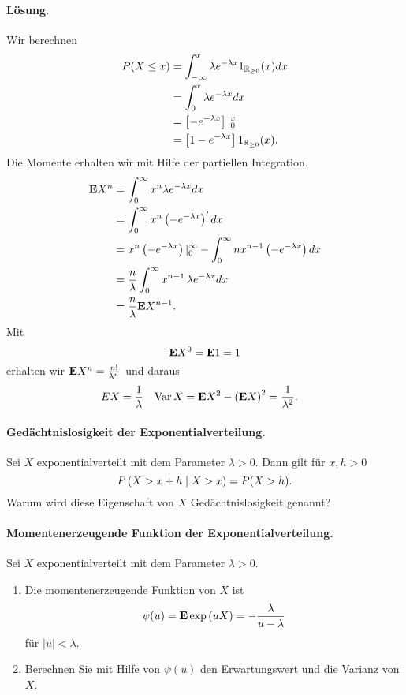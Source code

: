 \paragraph*{Lösung. } 
Wir berechnen
\begin{align*}
    P(X \leq x) & = 
    \int_{-\infty}^{x} \lambda e^{-\lambda x } 1_{\mathbb R_{\geq 0}}(x) dx \\
    &= \int_{0}^{x} \lambda e^{-\lambda x } dx \\
    &= \left[  - e^{-\lambda x}  \right] |_{0}^{x} \\
    &= \left[ 1 - e^{-\lambda x} \right] 1_{\mathbb R_{\geq 0}}(x).
\end{align*}
Die Momente erhalten wir mit Hilfe der partiellen Integration. 
\begin{align*}
    \mathbf{E} X^n &= \int_{0}^{\infty} x^n \lambda e^{- \lambda x} dx \\
    &= \int_{0}^{\infty} x^n\left( -e^{-\lambda x} \right)' dx \\
    &= x^n \left( - e^{-\lambda x} \right)|_{0}^{\infty} 
    - \int_{0}^{\infty} n x^{n-1} \left( -e^{-\lambda x} \right) dx  \\
    &= \frac{n}{\lambda} \int_{0}^{\infty} x^{n-1}\, \lambda e^{-\lambda x} dx \\
    & = \frac{n}{\lambda} \mathbf{E} X^{n-1}.
\end{align*}
Mit
\begin{equation*}
    \mathbf{E} X^{0} = \mathbf{E} 1 = 1
\end{equation*}
erhalten wir $\mathbf{E} X^n = \frac{n!}{\lambda^n}$ und daraus 
\begin{align*}
    E X &= \frac{1}{\lambda} &   \operatorname{Var} X &= \mathbf{E} X^2 - \left( \mathbf{E} X \right)^2 = 
    \frac{1}{\lambda^2}. 
\end{align*}


\paragraph{Gedächtnislosigkeit der Exponentialverteilung.}
Sei $X$ exponentialverteilt mit dem Parameter $\lambda>0$. Dann gilt für
$x,h>0$ 
\begin{equation*}
    P\left( X > x+h \;\middle\vert\; X > x \right) = P( X > h).
\end{equation*}
Warum wird diese Eigenschaft von $X$ Gedächtnislosigkeit genannt?

\paragraph{Momentenerzeugende Funktion der Exponentialverteilung. }
Sei $X$ exponentialverteilt mit dem Parameter $\lambda>0$. 
\begin{enumerate}
    \item Die momentenerzeugende Funktion von $X$ ist 
        \begin{equation*}
            \psi (u) = \mathbf{E} \exp \left( u X \right) = - \frac{\lambda}{u - \lambda}
        \end{equation*}
        für $|u| < \lambda$. 
    \item Berechnen Sie mit Hilfe von $\psi(u)$ den Erwartungswert und die Varianz von $X$. 
\end{enumerate}
